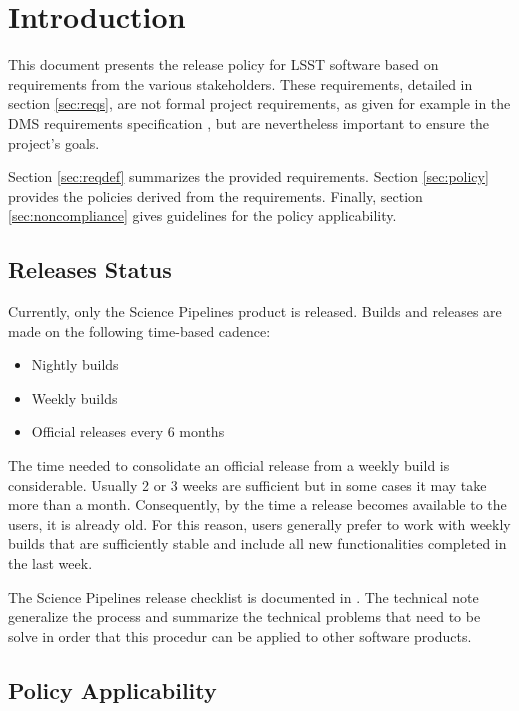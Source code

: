 \section{Introduction} \label{sec:intro}

This document presents the release policy for \gls{LSST} software based on requirements from the various stakeholders.
These requirements, detailed in section \ref{sec:reqs}, are not formal project requirements, as given for example in the \gls{DMS} requirements specification , but are nevertheless important to ensure the project's goals.

Section \ref{sec:reqdef} summarizes the provided requirements. 
Section \ref{sec:policy} provides the policies derived from the requirements.
Finally, section \ref{sec:noncompliance} gives guidelines for the policy applicability.


\subsection{Releases Status}\label{sec:sci}

Currently, only the \gls{Science Pipelines} product is released. 
Builds and releases are made on the following time-based cadence:

\begin{itemize}
\item Nightly builds
\item Weekly builds
\item Official releases every 6 months
\end{itemize}

The time needed to consolidate an official release from a weekly build is considerable.
Usually 2 or 3 weeks are sufficient but in some cases it may take more than a month. 
Consequently, by the time a release becomes available to the users, it is already old.
For this reason, users generally prefer to work with weekly builds that are sufficiently stable and include all new functionalities completed in the last week.

The \gls{Science Pipelines} release checklist is documented in .
The technical note  generalize the process and summarize the technical problems that need to be solve in order that this procedur can be applied to other software products.


\subsection{Policy Applicability} \label{sec:applicability}

